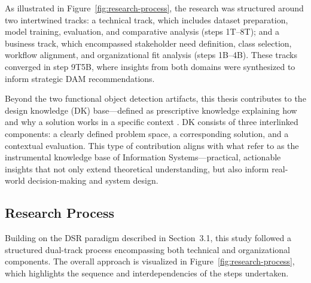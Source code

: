 \documentclass[a4paper,10pt,twocolumn]{article}
\numberwithin{figure}{section}
\numberwithin{table}{section}
\begin{document}
As illustrated in Figure~\ref{fig:research-process}, the research was structured 
around two intertwined tracks: a technical track, which includes dataset preparation, 
model training, evaluation, and comparative analysis (steps 1T–8T); and a business track, 
which encompassed stakeholder need definition, class selection, workflow alignment, 
and organizational fit analysis (steps 1B–4B). These tracks converged in step 9T5B, 
where insights from both domains were synthesized to inform strategic DAM recommendations.

Beyond the two functional object detection artifacts, this thesis contributes 
to the design knowledge (DK) base—defined as prescriptive knowledge explaining 
how and why a solution works in a specific context \citep{vomBrocke2020introduction}. 
DK consists of three interlinked components: a clearly defined problem space, 
a corresponding solution, and a contextual evaluation.
This type of contribution aligns with what \citet{gregor2013positioning} 
refer to as the instrumental knowledge base of Information Systems—practical, 
actionable insights that not only extend theoretical understanding, 
but also inform real-world decision-making and system design.

\subsection{Research Process}

Building on the DSR paradigm described in Section~3.1, 
this study followed a structured dual-track process 
encompassing both technical and organizational components. 
The overall approach is visualized in Figure~\ref{fig:research-process}, 
which highlights the sequence and interdependencies of the steps undertaken.
\end{document}
